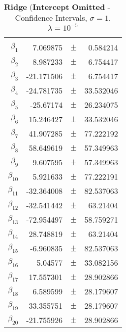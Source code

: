 \documentclass[...,numrefs]{wiley-article}
\begin{document}
\begin{table}[h]
    \centering
    \caption{$\textbf{Ridge (Intercept Omitted - Franke Function:}$ Confidence Intervals, $\sigma = 1$, $\lambda = 10^{-5}$}
    \begin{tabular}{rrrr}
    \hline
    \\
    $\beta_{1}$ & 7.069875 & $\pm$ & 0.584214 \\
    $\beta_{2}$ & 8.987233 & $\pm$ & 6.754417 \\
    $\beta_{3}$ & -21.171506 & $\pm$ & 6.754417 \\
    $\beta_{4}$ & -24.781735 & $\pm$ & 33.532046 \\
    $\beta_{5}$ & -25.67174 & $\pm$ & 26.234075 \\
    $\beta_{6}$ & 15.246427 & $\pm$ & 33.532046 \\
    $\beta_{7}$ & 41.907285 & $\pm$ & 77.222192 \\
    $\beta_{8}$ & 58.649619 & $\pm$ & 57.349963 \\
    $\beta_{9}$ & 9.607595 & $\pm$ & 57.349963 \\
    $\beta_{10}$ & 5.921633 & $\pm$ & 77.222191 \\
    $\beta_{11}$ & -32.364008 & $\pm$ & 82.537063 \\
    $\beta_{12}$ & -32.541442 & $\pm$ & 63.21404 \\
    $\beta_{13}$ & -72.954497 & $\pm$ & 58.759271 \\
    $\beta_{14}$ & 28.748819 & $\pm$ & 63.21404 \\
    $\beta_{15}$ & -6.960835 & $\pm$ & 82.537063 \\
    $\beta_{16}$ & 5.04577 & $\pm$ & 33.082156 \\
    $\beta_{17}$ & 17.557301 & $\pm$ & 28.902866 \\
    $\beta_{18}$ & 6.589599 & $\pm$ & 28.179607 \\
    $\beta_{19}$ & 33.355751 & $\pm$ & 28.179607 \\
    $\beta_{20}$ & -21.755926 & $\pm$ & 28.902866 \\
    \hline
    \end{tabular}

    \label{tab:my_label}
\end{table}
\end{document}
